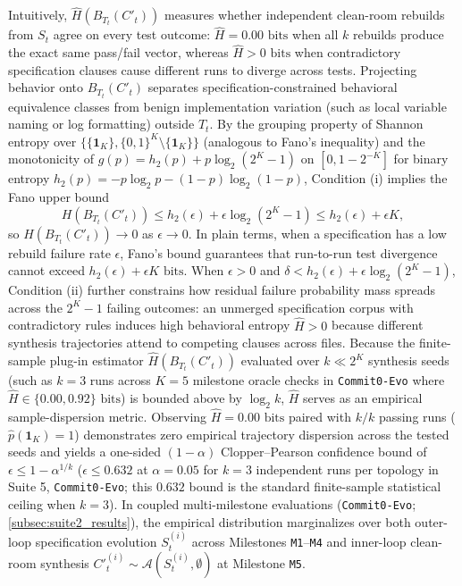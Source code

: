 \documentclass[11pt,a4paper,copyright]{google}
\begin{document}
Intuitively, $\hat{H}(B_{T_t}(C'_t))$ measures whether independent clean-room rebuilds from $S_t$ agree on every test outcome: $\hat{H} = 0.00\text{ bits}$ when all $k$ rebuilds produce the exact same pass/fail vector, whereas $\hat{H} > 0\text{ bits}$ when contradictory specification clauses cause different runs to diverge across tests. Projecting behavior onto $B_{T_t}(C'_t)$ separates specification-constrained behavioral equivalence classes from benign implementation variation (such as local variable naming or log formatting) outside $T_t$. By the grouping property of Shannon entropy over $\{\{\mathbf{1}_K\}, \{0,1\}^K \setminus \{\mathbf{1}_K\}\}$ (analogous to Fano's inequality) and the monotonicity of $g(p) = h_2(p) + p \log_2(2^K - 1)$ on $[0, 1 - 2^{-K}]$ for binary entropy $h_2(p) = -p \log_2 p - (1-p)\log_2(1-p)$, Condition (i) implies the Fano upper bound
\[
H(B_{T_t}(C'_t)) \le h_2(\epsilon) + \epsilon \log_2(2^K - 1) \le h_2(\epsilon) + \epsilon K,
\]
so $H(B_{T_t}(C'_t)) \to 0$ as $\epsilon \to 0$. In plain terms, when a specification has a low rebuild failure rate $\epsilon$, Fano's bound guarantees that run-to-run test divergence cannot exceed $h_2(\epsilon) + \epsilon K\text{ bits}$. When $\epsilon > 0$ and $\delta < h_2(\epsilon) + \epsilon \log_2(2^K - 1)$, Condition (ii) further constrains how residual failure probability mass spreads across the $2^K - 1$ failing outcomes: an unmerged specification corpus with contradictory rules induces high behavioral entropy $\hat{H} > 0$ because different synthesis trajectories attend to competing clauses across files. Because the finite-sample plug-in estimator $\hat{H}(B_{T_t}(C'_t))$ evaluated over $k \ll 2^K$ synthesis seeds (such as $k=3$ runs across $K=5$ milestone oracle checks in \texttt{Commit0-Evo} where $\hat{H} \in \{0.00, 0.92\}\text{ bits}$) is bounded above by $\log_2 k$, $\hat{H}$ serves as an empirical sample-dispersion metric. Observing $\hat{H} = 0.00\text{ bits}$ paired with $k/k$ passing runs ($\hat{p}(\mathbf{1}_K) = 1$) demonstrates zero empirical trajectory dispersion across the tested seeds and yields a one-sided $(1-\alpha)$ Clopper--Pearson confidence bound of $\epsilon \le 1 - \alpha^{1/k}$ ($\epsilon \le 0.632$ at $\alpha = 0.05$ for $k = 3$ independent runs per topology in Suite 5, \texttt{Commit0-Evo}; this $0.632$ bound is the standard finite-sample statistical ceiling when $k=3$). In coupled multi-milestone evaluations (\texttt{Commit0-Evo}; \cref{subsec:suite2_results}), the empirical distribution marginalizes over both outer-loop specification evolution $S_t^{(i)}$ across Milestones \texttt{M1}--\texttt{M4} and inner-loop clean-room synthesis $C'^{(i)}_t \sim \mathcal{A}(S_t^{(i)}, \emptyset)$ at Milestone \texttt{M5}.
\end{document}
